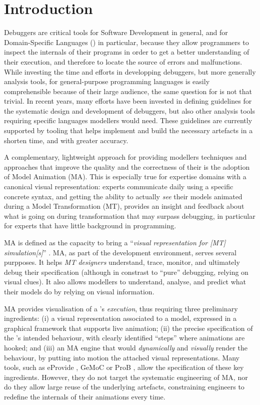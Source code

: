 \section{Introduction}
\label{sec:Introduction}

Debuggers are critical tools for Software Development in general, and for 
Domain-Specific Languages (\DSLs) in particular, because they allow programmers
to inspect the internals of their programs in order to get a better understanding
of their execution, and therefore to locate the source of errors and malfunctions.
While investing the time and efforts in developping debuggers, but more generally
analysis tools, for general-purpose programming languages is easily comprehensible
because of their large audience, the same question for \DSLs is not that trivial.
In recent years, many efforts have been invested in defining guidelines for the
systematic design and development of debuggers, but also other analysis tools 
requiring specific languages modellers would need. These guidelines are currently
supported by tooling that helps implement and build the necessary artefacts in a
shorten time, and with greater accuracy.

A complementary, lightweight approach for providing modellers techniques and 
approaches that improve the quality and the correctness of their \DSLs is the 
adoption of Model Animation (MA). This is especially true for expertise domains 
with a canonical visual representation: experts communicate daily using a specific
concrete syntax, and getting the ability to actually \emph{see} their models 
animated during a Model Transformation (MT), provides an insight and feedback 
about what is going on during transformation that may surpass debugging, in 
particular for experts that have little background in programming.

MA is defined as the capacity to bring a ``\emph{visual representation for [MT] 
simulation[s]}'' \cite{J:Lucio-Amrani-etAl:2014}. MA, as part of the \DSL development
environment, serves several purpposes. It helps \emph{MT designers} understand, trace, 
monitor, and ultimately debug their specification (although in constrast to 
``pure'' debugging, relying on visual clues). It also allows modellers to understand,
analyse, and predict what their models do by relying on visual information. 

MA provides visualisation of a \DSL's \emph{execution}, thus requiring three preliminary
ingredients: (i) a visual representation associated to a model, expressed in a 
graphical framework that supports live animation; (ii) the precise specification
of the \DSL's intended behaviour, with clearly identified ``steps'' where animations
are hooked; and (iii) an MA engine that would \emph{dynamically} and \emph{visually}
render the behaviour, by putting into motion the attached visual representations.
Many tools, such as eProvide \citep{Sadilek-Wachsmuth:2008}, GeMoC \citep{combemale2016tool}
or ProB \cite{leuschel2008prob}, allow the specification of these key ingredients.
However, they do not target the systematic engineering of MA, nor do they allow
large reuse of the underlying artefacts, constraining \DSL engineers to redefine
the internals of their animations every time.

